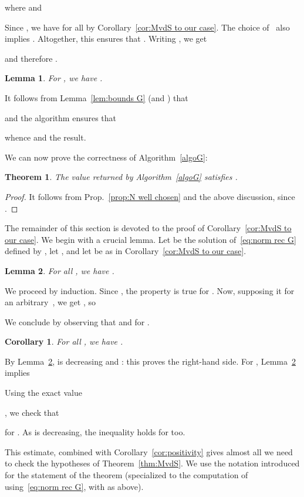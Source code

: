 \documentclass[10pt, conference]{IEEEtran}
\newtheorem{corollary}{Corollary}
\newtheorem{lemma}{Lemma}
\newtheorem{theorem}{Theorem}
\begin{document}
where  and 

Since , we have  for all  by Corollary~\ref{cor:MvdS to our case}. The choice of~ also implies . Altogether, this ensures that . Writing , we get 

and therefore
.
\begin{lemma}
    For , we have .
\end{lemma}
\begin{IEEEproof}
  It follows from Lemma~\ref{lem:bounds G} (and ) that
    
    and the algorithm ensures that 
    
    whence  and the result.
\end{IEEEproof}

We can now prove the correctness of Algorithm~\ref{algoG}:
\begin{theorem}
  The value  returned by Algorithm~\ref{algoG} satisfies .
\end{theorem}
\begin{proof}
  It follows from Prop.~\ref{prop:N well chosen} and the above discussion, since .
\end{proof}
The remainder of this section is devoted to the proof of Corollary~\ref{cor:MvdS to our case}.
We begin with a crucial lemma.
Let  be the solution of~\eqref{eq:norm rec G} defined by , let , and let  be as in Corollary~\ref{cor:MvdS to our case}.
\begin{lemma} \mightbeomitted
  \label{lem:bound dn}
  For all , we have .
\end{lemma}
\begin{IEEEproof}
  We proceed by induction. Since ,  the property is true for . Now, supposing it for an arbitrary~, we get , so

We conclude by observing that  and  for .
\end{IEEEproof}
\begin{corollary} \mightbeomitted
  \label{cor:estim dn}
  For all , we have .
\end{corollary}
\begin{IEEEproof}
  By Lemma~\ref{lem:bound dn},  is decreasing and : this proves the right-hand side.
  For , Lemma~\ref{lem:bound dn} implies

Using the exact value

\cite[Eq.~4.36.1]{DLMF},
we check that

for .
As  is decreasing, the inequality holds for  too.
\end{IEEEproof}

This estimate, combined with Corollary~\ref{cor:positivity} gives almost all we need to check the hypotheses of Theorem~\ref{thm:MvdS}. We use the notation introduced for the statement of the theorem (specialized to the computation of  using~\eqref{eq:norm rec G}, with  as above).
\end{document}
